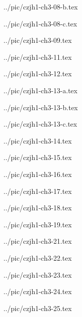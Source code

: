 ../pic/czjh1-ch3-08-b.tex



../pic/czjh1-ch3-08-c.tex



../pic/czjh1-ch3-09.tex



../pic/czjh1-ch3-11.tex



../pic/czjh1-ch3-12.tex



../pic/czjh1-ch3-13-a.tex



../pic/czjh1-ch3-13-b.tex



../pic/czjh1-ch3-13-c.tex



../pic/czjh1-ch3-14.tex



../pic/czjh1-ch3-15.tex



../pic/czjh1-ch3-16.tex



../pic/czjh1-ch3-17.tex



../pic/czjh1-ch3-18.tex



../pic/czjh1-ch3-19.tex



../pic/czjh1-ch3-21.tex



../pic/czjh1-ch3-22.tex



../pic/czjh1-ch3-23.tex



../pic/czjh1-ch3-24.tex



../pic/czjh1-ch3-25.tex



